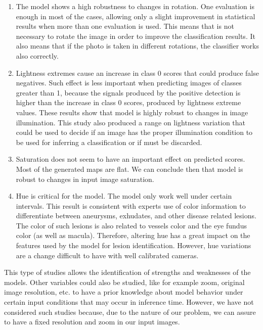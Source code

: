 \begin{enumerate}[label=\Alph*)]

\item The model shows a high robustness to changes in rotation. One evaluation is enough in most of the cases, allowing only a slight improvement in statistical results when more than one evaluation is used. This means that is not necessary to rotate the image in order to improve the classification results. It also means that if the photo is taken in different rotations, the classifier works also correctly.

\item Lightness extremes cause an increase in class 0 scores that could produce false negatives. Such effect is less important when predicting images of classes greater than 1, because the signals produced by the positive detection is higher than the increase in class 0 scores, produced by lightness extreme values. These results show that model is highly robust to changes in image illumination. This study also produced a range on lightness variation that could be used to decide if an image has the proper illumination condition to be used for inferring a classification or if must be discarded.

\item Saturation does not seem to have an important effect on predicted scores. Most of the generated maps are flat. We can conclude then that model is robust to changes in input image saturation.

\item Hue is critical for the model. The model only work well under certain intervals. This result is consistent with experts use of color information to differentiate between aneurysms, exhudates, and other disease related lesions. The color of such lesions is also related to vessels color and the eye fundus color (as well as macula). Therefore, altering hue has a great impact on the features used by the model for lesion identification. However, hue variations are a change difficult to have with well calibrated cameras.

\end{enumerate}

This type of studies allows the identification of strengths and weaknesses of the models. Other variables could also be studied, like for example zoom, original image resolution, etc. to have a prior knowledge about model behavior under certain input conditions that may occur in inference time. However, we have not considered such studies because, due to the nature of our problem, we can assure to have a fixed resolution and zoom in our input images.

